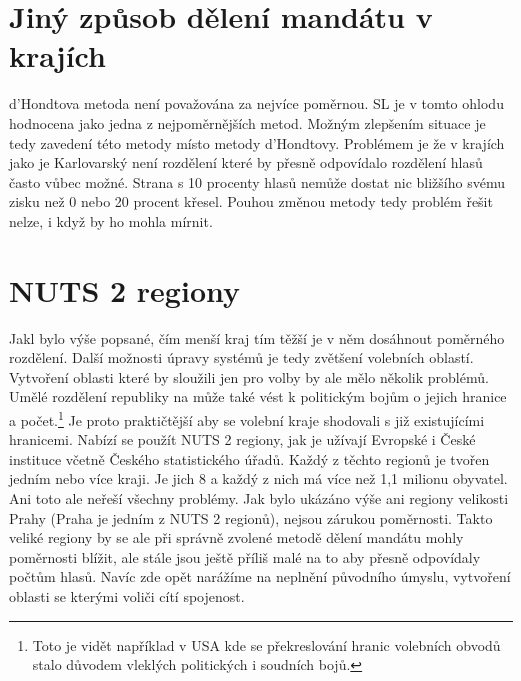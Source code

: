 \documentclass[12pt]{report}
\begin{document}
\section{Jiný způsob dělení mandátu v krajích} d'Hondtova metoda není považována za nejvíce poměrnou.
SL je v tomto ohlodu hodnocena jako jedna z nejpoměrnějších metod.\autocite{BEN} Možným zlepšením situace je tedy zavedení této metody místo metody d'Hondtovy.
Problémem je že v krajích jako je Karlovarský není rozdělení které by přesně odpovídalo rozdělení hlasů často vůbec možné.
Strana s 10 procenty hlasů nemůže dostat nic bližšího svému zisku než 0 nebo 20 procent křesel.
Pouhou změnou metody tedy problém řešit nelze, i když by ho mohla mírnit.
\section{NUTS 2 regiony} Jakl bylo výše popsané, čím menší kraj tím těžší je v něm dosáhnout poměrného rozdělení.
Další možnosti úpravy systémů je tedy zvětšení volebních oblastí.
Vytvoření oblasti které by sloužili jen pro volby by ale mělo několik problémů.
Umělé rozdělení republiky na  může také vést k politickým bojům o jejich hranice a počet.\footnote{Toto je vidět například v USA kde se překreslování hranic volebních obvodů stalo důvodem vleklých politických i soudních bojů.} Je proto praktičtější aby se volební kraje shodovali s již existujícími hranicemi.
Nabízí se použít NUTS 2 regiony, jak je užívají Evropské i České instituce včetně Českého statistického úřadů.
Každý z těchto regionů je tvořen jedním nebo více kraji.
Je jich 8 a každý z nich má více než 1,1 milionu obyvatel.
Ani toto ale neřeší všechny problémy.
Jak bylo ukázáno výše ani regiony velikosti Prahy (Praha je jedním z NUTS 2 regionů), nejsou zárukou poměrnosti.
Takto veliké regiony by se ale při správně zvolené metodě dělení mandátu mohly poměrnosti blížit, ale stále jsou ještě příliš malé na to aby přesně odpovídaly počtům hlasů.
Navíc zde opět narážíme na neplnění původního úmyslu, vytvoření oblasti se kterými voliči cítí spojenost.
\end{document}
